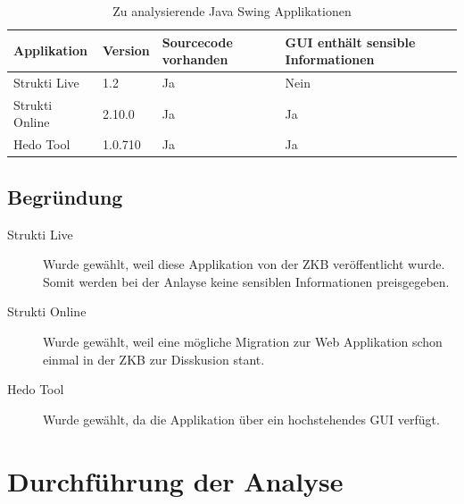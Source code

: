   \begin{table}[ht]
    \sffamily 
    \begin{center}
      \begin{tabular}{llp{2cm}p{3.5cm}}
        \toprule
        \textbf{Applikation} & \textbf{Version} & \textbf{Sourcecode vorhanden}
        & \textbf{GUI enthält sensible Informationen}\\
        \midrule
        Strukti Live & 1.2 & Ja & Nein\\
        Strukti Online & 2.10.0 & Ja & Ja\\
        Hedo Tool & 1.0.710 & Ja & Ja\\
        \bottomrule
      \end{tabular}
      \caption{Zu analysierende Java Swing Applikationen}
      \label{tab:zuAnalysierendeJavaSwingApplikationen}
    \end{center}
  \end{table}
  
  \subsection{Begründung}
  
  \begin{description}
  \item[Strukti Live]
  Wurde gewählt, weil diese Applikation von der ZKB veröffentlicht wurde. Somit
  werden bei der Anlayse keine sensiblen Informationen preisgegeben.
  
  \item[Strukti Online]
  Wurde gewählt, weil eine mögliche Migration zur Web Applikation schon einmal
  in der \ac{ZKB} zur Disskusion stant.
  
  \item[Hedo Tool]
  Wurde gewählt, da die Applikation über ein hochstehendes \ac{GUI} verfügt.
  \end{description}
  
  \section{Durchführung der Analyse}
  
